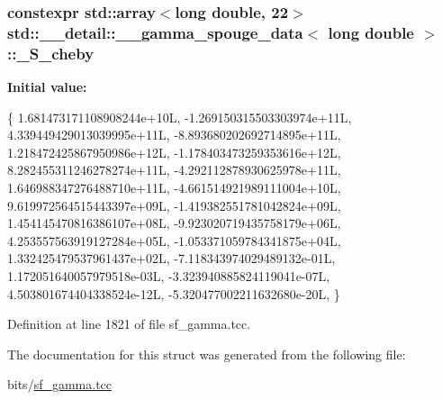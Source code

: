 \subsubsection[{\texorpdfstring{\+\_\+\+S\+\_\+cheby}{_S_cheby}}]{\setlength{\rightskip}{0pt plus 5cm}constexpr std\+::array$<$long double, 22$>$ {\bf std\+::\+\_\+\+\_\+detail\+::\+\_\+\+\_\+gamma\+\_\+spouge\+\_\+data}$<$ long double $>$\+::\+\_\+\+S\+\_\+cheby\hspace{0.3cm}{\ttfamily [static]}}\hypertarget{structstd_1_1____detail_1_1____gamma__spouge__data_3_01long_01double_01_4_ad1b0c2af63c28d0eaff89430d1b54589}{}\label{structstd_1_1____detail_1_1____gamma__spouge__data_3_01long_01double_01_4_ad1b0c2af63c28d0eaff89430d1b54589}
{\bfseries Initial value\+:}
\begin{DoxyCode}
\{
     1.681473171108908244e+10L,
    -1.269150315503303974e+11L,
     4.339449429013039995e+11L,
    -8.893680202692714895e+11L,
     1.218472425867950986e+12L,
    -1.178403473259353616e+12L,
     8.282455311246278274e+11L,
    -4.292112878930625978e+11L,
     1.646988347276488710e+11L,
    -4.661514921989111004e+10L,
     9.619972564515443397e+09L,
    -1.419382551781042824e+09L,
     1.454145470816386107e+08L,
    -9.923020719435758179e+06L,
     4.253557563919127284e+05L,
    -1.053371059784341875e+04L,
     1.332425479537961437e+02L,
    -7.118343974029489132e-01L,
     1.172051640057979518e-03L,
    -3.323940885824119041e-07L,
     4.503801674404338524e-12L,
    -5.320477002211632680e-20L,
      \}
\end{DoxyCode}


Definition at line 1821 of file sf\+\_\+gamma.\+tcc.



The documentation for this struct was generated from the following file\+:\begin{DoxyCompactItemize}
\item 
bits/\hyperlink{sf__gamma_8tcc}{sf\+\_\+gamma.\+tcc}\end{DoxyCompactItemize}
